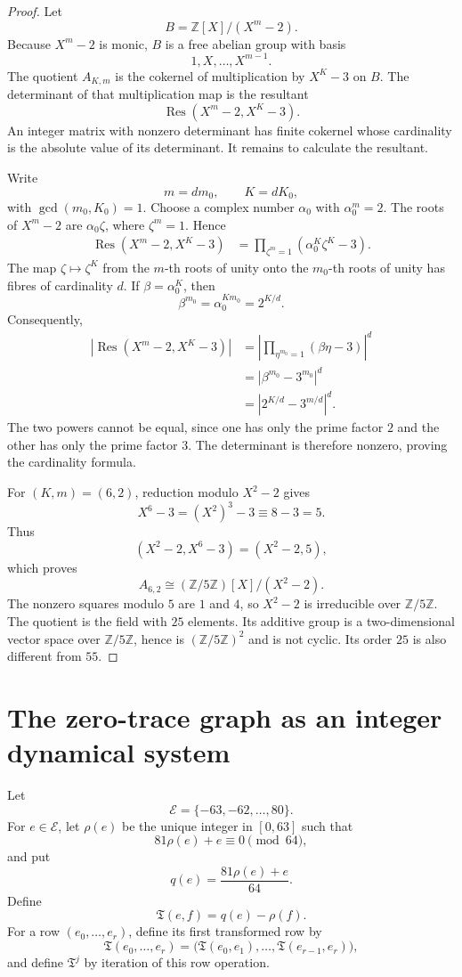 \documentclass[11pt]{article}
\theoremstyle{definition}
\theoremstyle{remark}
\newcommand{\Z}{\mathbb{Z}}
\newcommand{\E}{\mathcal{E}}
\newcommand{\Tq}{\mathfrak{T}}
\begin{document}
\begin{proof}
Let
\[
B=\Z[X]/(X^m-2).
\]
Because $X^m-2$ is monic, $B$ is a free abelian group with basis
\[
1,X,\ldots,X^{m-1}.
\]
The quotient $A_{K,m}$ is the cokernel of multiplication by $X^K-3$ on $B$. The determinant of that multiplication map is the resultant
\[
\operatorname{Res}(X^m-2,X^K-3).
\]
An integer matrix with nonzero determinant has finite cokernel whose cardinality is the absolute value of its determinant. It remains to calculate the resultant.

Write
\[
m=dm_0,\qquad K=dK_0,
\]
with $\gcd(m_0,K_0)=1$. Choose a complex number $\alpha_0$ with $\alpha_0^m=2$. The roots of $X^m-2$ are $\alpha_0\zeta$, where $\zeta^m=1$. Hence
\begin{align*}
\operatorname{Res}(X^m-2,X^K-3)
&=\prod_{\zeta^m=1}\left(\alpha_0^K\zeta^K-3\right).
\end{align*}
The map $\zeta\mapsto\zeta^K$ from the $m$-th roots of unity onto the $m_0$-th roots of unity has fibres of cardinality $d$. If $\beta=\alpha_0^K$, then
\[
\beta^{m_0}=\alpha_0^{Km_0}=2^{K/d}.
\]
Consequently,
\begin{align*}
\left|\operatorname{Res}(X^m-2,X^K-3)\right|
&=\left|\prod_{\eta^{m_0}=1}(\beta\eta-3)\right|^d\\
&=\left|\beta^{m_0}-3^{m_0}\right|^d\\
&=\left|2^{K/d}-3^{m/d}\right|^d.
\end{align*}
The two powers cannot be equal, since one has only the prime factor $2$ and the other has only the prime factor $3$. The determinant is therefore nonzero, proving the cardinality formula.

For $(K,m)=(6,2)$, reduction modulo $X^2-2$ gives
\[
X^6-3=(X^2)^3-3\equiv 8-3=5.
\]
Thus
\[
(X^2-2,X^6-3)=(X^2-2,5),
\]
which proves
\[
A_{6,2}\cong (\Z/5\Z)[X]/(X^2-2).
\]
The nonzero squares modulo $5$ are $1$ and $4$, so $X^2-2$ is irreducible over $\Z/5\Z$. The quotient is the field with $25$ elements. Its additive group is a two-dimensional vector space over $\Z/5\Z$, hence is $(\Z/5\Z)^2$ and is not cyclic. Its order $25$ is also different from $55$.
\end{proof}

\section{The zero-trace graph as an integer dynamical system}

Let
\[
\E=\{-63,-62,\ldots,80\}.
\]
For $e\in\E$, let $\rho(e)$ be the unique integer in $[0,63]$ such that
\[
81\rho(e)+e\equiv 0\pmod{64},
\]
and put
\[
q(e)=\frac{81\rho(e)+e}{64}.
\]
Define
\[
\Tq(e,f)=q(e)-\rho(f).
\]
For a row $(e_0,\ldots,e_r)$, define its first transformed row by
\[
\Tq(e_0,\ldots,e_r)
=
\bigl(\Tq(e_0,e_1),\ldots,\Tq(e_{r-1},e_r)\bigr),
\]
and define $\Tq^j$ by iteration of this row operation.
\end{document}
